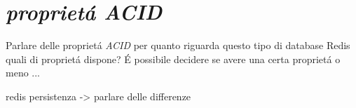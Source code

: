 \chapter{\emph{proprietá ACID}}
Parlare delle proprietá \emph{ACID} per quanto riguarda questo tipo di database
Redis quali di proprietá dispone?
É possibile decidere se avere una certa proprietá o meno ...

redis persistenza -> parlare delle differenze
